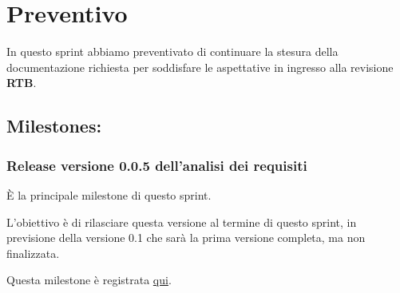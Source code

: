 \section{Preventivo}

In questo sprint abbiamo preventivato di continuare la stesura della documentazione richiesta per soddisfare le aspettative in ingresso alla revisione \textbf{RTB}.

\subsection{Milestones:}  
\subsubsection{Release versione 0.0.5 dell'analisi dei requisiti}

È la principale milestone di questo sprint.

L'obiettivo è di rilasciare questa versione al termine di questo sprint, in previsione della versione 0.1 che sarà la prima versione completa, ma non finalizzata.

Questa milestone è registrata \href{https://github.com/SWEasabi/analisi-dei-requisiti/milestone/5}{qui}.